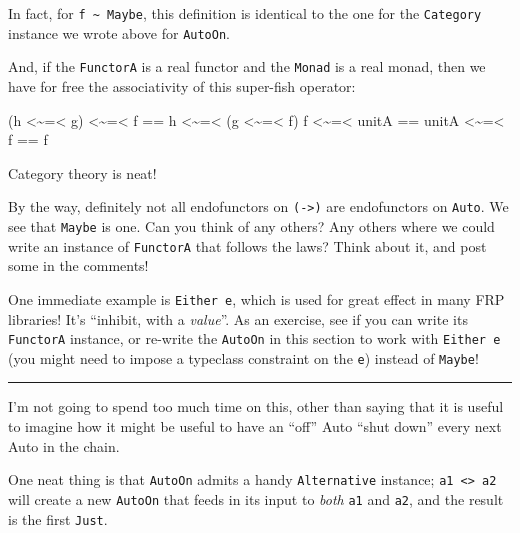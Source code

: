 \documentclass[]{article}
\newenvironment{Shaded}{}{}
\newcommand{\NormalTok}[1]{#1}
\newcommand{\OperatorTok}[1]{\textcolor[rgb]{0.40,0.40,0.40}{#1}}
\begin{document}
In fact, for \texttt{f\ \textasciitilde{}\ Maybe}, this definition is identical
to the one for the \texttt{Category} instance we wrote above for
\texttt{AutoOn}.

And, if the \texttt{FunctorA} is a real functor and the \texttt{Monad} is a real
monad, then we have for free the associativity of this super-fish operator:

\begin{Shaded}
\begin{Highlighting}[]
\NormalTok{(h }\OperatorTok{<\textasciitilde{}=<}\NormalTok{ g) }\OperatorTok{<\textasciitilde{}=<}\NormalTok{ f }\OperatorTok{==}\NormalTok{ h }\OperatorTok{<\textasciitilde{}=<}\NormalTok{ (g }\OperatorTok{<\textasciitilde{}=<}\NormalTok{ f)}
\NormalTok{f }\OperatorTok{<\textasciitilde{}=<}\NormalTok{ unitA      }\OperatorTok{==}\NormalTok{ unitA }\OperatorTok{<\textasciitilde{}=<}\NormalTok{ f      }\OperatorTok{==}\NormalTok{ f}
\end{Highlighting}
\end{Shaded}

Category theory is neat!

By the way, definitely not all endofunctors on \texttt{(-\textgreater{})} are
endofunctors on \texttt{Auto}. We see that \texttt{Maybe} is one. Can you think
of any others? Any others where we could write an instance of \texttt{FunctorA}
that follows the laws? Think about it, and post some in the comments!

One immediate example is \texttt{Either\ e}, which is used for great effect in
many FRP libraries! It's ``inhibit, with a \emph{value}''. As an exercise, see
if you can write its \texttt{FunctorA} instance, or re-write the \texttt{AutoOn}
in this section to work with \texttt{Either\ e} (you might need to impose a
typeclass constraint on the \texttt{e}) instead of \texttt{Maybe}!

\begin{center}\rule{0.5\linewidth}{\linethickness}\end{center}

I'm not going to spend too much time on this, other than saying that it is
useful to imagine how it might be useful to have an ``off'' Auto ``shut down''
every next Auto in the chain.

One neat thing is that \texttt{AutoOn} admits a handy \texttt{Alternative}
instance; \texttt{a1\ \textless{}\textbar{}\textgreater{}\ a2} will create a new
\texttt{AutoOn} that feeds in its input to \emph{both} \texttt{a1} and
\texttt{a2}, and the result is the first \texttt{Just}.
\end{document}

